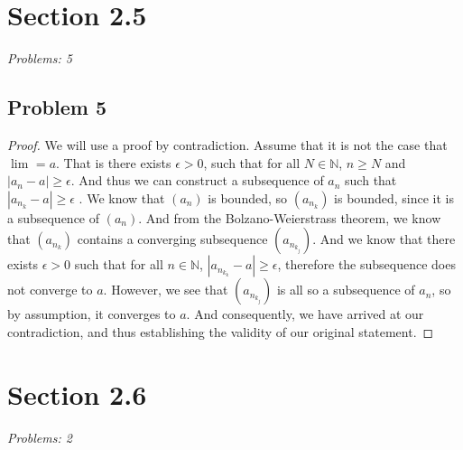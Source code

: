 \documentclass[12pt]{article}
\begin{document}

\section*{Section 2.5}
\textit{Problems: 5}
\subsection*{Problem 5}
\begin{proof}
    We will use a proof by contradiction. 
    Assume that it is not the case that $\lim_{} = a$. 
    That is there exists $\epsilon > 0$, such that for all $N \in \mathbb{N}$, $n \ge N$ and $|a_n - a| \ge \epsilon$. 
    And thus we can construct a subsequence of $a_n$ such that $|a_{n_k} - a| \ge \epsilon$ . 
    We know that $(a_n)$ is bounded, so $(a_{n_k})$ is bounded, since it is a subsequence of $(a_n)$. 
    And from the Bolzano-Weierstrass theorem, we know that $(a_{n_k})$ contains a converging subsequence $(a_{n_{k_j}})$. 
    And we know that there exists $\epsilon > 0$ such that for all $n \in \mathbb{N}$, $|a_{n_{k_{k}}} - a| \ge \epsilon$, therefore the subsequence does not converge to $a$. 
    However, we see that $(a_{n_{k_j}})$ is all so a subsequence of $a_n$, so by assumption, it converges to $a$. 
    And consequently, we have arrived at our contradiction, and thus establishing the validity of our original statement. 
\end{proof}


\vspace*{1cm}


\section*{Section 2.6}
\textit{Problems: 2}
\end{document}
